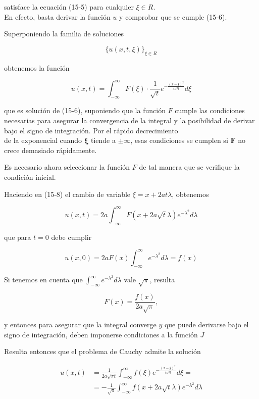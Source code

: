 \documentclass[10pt]{article}
\theoremstyle{plain}
\theoremstyle{definition}
\theoremstyle{remark}
\begin{document}
satisface la ecuación (15-5) para cualquier $\xi \in R$.\\
En efecto, basta derivar la función $u$ y comprobar que se cumple (15-6).

Superponiendo la familia de soluciones

$$
\{u(x, t, \xi)\}_{\xi \in R}
$$

obtenemos la función


\begin{equation*}
u(x, t)=\int_{-\infty}^{\infty} F(\xi) \cdot \frac{1}{\sqrt{t}} e^{-\frac{(x-\xi)^{2}}{4 a^{2} t}} d \xi \tag{15-8}
\end{equation*}


que es solución de (15-6), suponiendo que la función $F$ cumple las condiciones necesarias para asegurar la convergencia de la integral y la posibilidad de derivar bajo el signo de integración. Por el rápido decrecimiento\\
de la exponencial cuando $\boldsymbol{\xi}$ tiende a $\pm \infty$, esas condiciones se cumplen si $\boldsymbol{F}$ no crece demasiado rápidamente.

Es necesario ahora seleccionar la función $F$ de tal manera que se verifique la condición inicial.

Haciendo en (15-8) el cambio de variable $\xi=x+2 a t \lambda$, obtenemos

$$
u(x, t)=2 a \int_{-\infty}^{\infty} F(x+2 a \sqrt{t} \lambda) e^{-\lambda^{2}} d \lambda
$$

que para $t=0$ debe cumplir

$$
u(x, 0)=2 a F(x) \int_{-\infty}^{\infty} e^{-\lambda^{2}} d \lambda=f(x)
$$

Si tenemos en cuenta que $\int_{-\infty}^{\infty} e^{-\lambda^{2}} d \lambda$ vale $\sqrt{\pi}$, resulta

$$
F(x)=\frac{f(x)}{2 a \sqrt{\pi}},
$$

y entonces para asegurar que la integral converge $y$ que puede derivarse bajo el signo de integración, deben imponerse condiciones a la función $J$

Resulta entonces que el problema de Cauchy admite la solución

$$
\begin{aligned}
u(x, t) & =\frac{1}{2 a \sqrt{\pi t}} \int_{-\infty}^{\infty} f(\xi) e^{-\frac{(x-\xi)^{2}}{4 a^{2} t}} d \xi= \\
& =-\frac{1}{\sqrt{\pi}} \int_{-\infty}^{\infty} f(x+2 a \sqrt{t} \lambda) e^{-\lambda^{2}} d \lambda
\end{aligned}
$$
\end{document}
